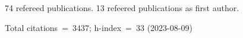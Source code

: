 74 refereed publications. 13 refeered publications as first author.

Total citations~=~3437; h-index~=~33 (2023-08-09)
